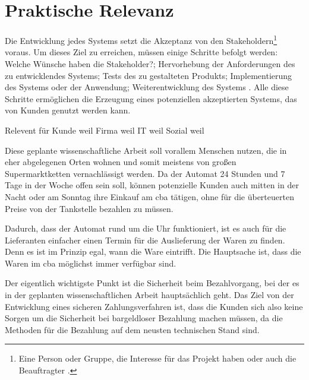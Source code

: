 \section{Praktische Relevanz}

Die Entwicklung jedes Systems setzt die Akzeptanz von den Stakeholdern\footnote{Eine Person oder Gruppe, die Interesse für das Projekt 
haben oder auch die Beauftragter \cite{refip:HSSI}.} voraus. Um dieses Ziel zu erreichen, müssen einige Schritte befolgt
werden: Welche Wünsche haben die Stakeholder?; Hervorhebung der Anforderungen des zu entwicklendes Systems;
Tests des zu gestalteten Produkts; Implementierung des Systems oder der Anwendung; Weiterentwicklung des
Systems \cite{refbook:RECR}. Alle diese Schritte ermöglichen die Erzeugung eines potenziellen akzeptierten 
Systems, das von Kunden genutzt werden kann.

Relevent für Kunde weil
Firma weil
IT weil
Sozial weil


Diese geplante wissenschaftliche Arbeit soll vorallem Menschen nutzen, die in eher abgelegenen Orten wohnen und somit 
meistens von großen Supermarktketten vernachlässigt werden. Da der Automat 24 Stunden und 7 Tage in der Woche 
offen sein soll, können potenzielle Kunden auch mitten in der Nacht oder am Sonntag ihre Einkauf am \acrfull{cba} tätigen,
ohne für die überteuerten Preise von der Tankstelle bezahlen zu müssen. 


Dadurch, dass der Automat rund um die Uhr funktioniert, ist es auch für die Lieferanten einfacher einen Termin für die Auslieferung 
der Waren zu finden. Denn es ist im Prinzip egal, wann die Ware eintrifft. Die Hauptsache ist, dass die Waren im \acrfull{cba}
möglichst immer verfügbar sind. 

Der eigentlich wichtigste Punkt ist die Sicherheit beim Bezahlvorgang, bei der es in der geplanten wissenschaftlichen Arbeit 
hauptsächlich geht. Das Ziel von der Entwicklung eines sicheren Zahlungsverfahren ist, dass die Kunden sich also keine Sorgen 
um die Sicherheit bei bargeldloser Bezahlung machen müssen, da die Methoden für die Bezahlung auf dem neusten technischen Stand sind.

